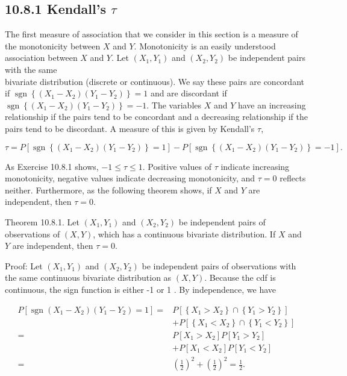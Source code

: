 \subsection*{10.8.1 Kendall's $\tau$}
The first measure of association that we consider in this section is a measure of the monotonicity between $X$ and $Y$. Monotonicity is an easily understood association between $X$ and $Y$. Let $\left(X_{1}, Y_{1}\right)$ and $\left(X_{2}, Y_{2}\right)$ be independent pairs with the same\\
bivariate distribution (discrete or continuous). We say these pairs are concordant if $\operatorname{sgn}\left\{\left(X_{1}-X_{2}\right)\left(Y_{1}-Y_{2}\right)\right\}=1$ and are discordant if $\operatorname{sgn}\left\{\left(X_{1}-X_{2}\right)\left(Y_{1}-Y_{2}\right)\right\}=-1$. The variables $X$ and $Y$ have an increasing relationship if the pairs tend to be concordant and a decreasing relationship if the pairs tend to be discordant. A measure of this is given by Kendall's $\tau$,


\begin{equation*}
\tau=P\left[\operatorname{sgn}\left\{\left(X_{1}-X_{2}\right)\left(Y_{1}-Y_{2}\right)\right\}=1\right]-P\left[\operatorname{sgn}\left\{\left(X_{1}-X_{2}\right)\left(Y_{1}-Y_{2}\right)\right\}=-1\right] . \tag{10.8.1}
\end{equation*}


As Exercise 10.8.1 shows, $-1 \leq \tau \leq 1$. Positive values of $\tau$ indicate increasing monotonicity, negative values indicate decreasing monotonicity, and $\tau=0$ reflects neither. Furthermore, as the following theorem shows, if $X$ and $Y$ are independent, then $\tau=0$.

Theorem 10.8.1. Let $\left(X_{1}, Y_{1}\right)$ and $\left(X_{2}, Y_{2}\right)$ be independent pairs of observations of $(X, Y)$, which has a continuous bivariate distribution. If $X$ and $Y$ are independent, then $\tau=0$.

Proof: Let $\left(X_{1}, Y_{1}\right)$ and $\left(X_{2}, Y_{2}\right)$ be independent pairs of observations with the same continuous bivariate distribution as $(X, Y)$. Because the cdf is continuous, the sign function is either -1 or 1 . By independence, we have

$$
\begin{aligned}
P\left[\operatorname{sgn}\left(X_{1}-X_{2}\right)\left(Y_{1}-Y_{2}\right)=1\right]= & P\left[\left\{X_{1}>X_{2}\right\} \cap\left\{Y_{1}>Y_{2}\right\}\right] \\
& +P\left[\left\{X_{1}<X_{2}\right\} \cap\left\{Y_{1}<Y_{2}\right\}\right] \\
= & P\left[X_{1}>X_{2}\right] P\left[Y_{1}>Y_{2}\right] \\
& +P\left[X_{1}<X_{2}\right] P\left[Y_{1}<Y_{2}\right] \\
= & \left(\frac{1}{2}\right)^{2}+\left(\frac{1}{2}\right)^{2}=\frac{1}{2} .
\end{aligned}
$$

